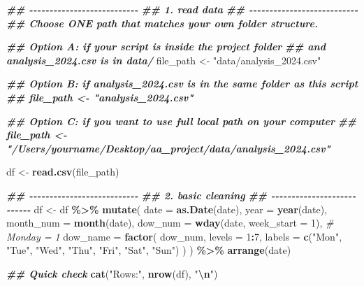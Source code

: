 \documentclass[
]{article}
\newenvironment{Shaded}{\begin{snugshade}}{\end{snugshade}}
\newcommand{\AttributeTok}[1]{\textcolor[rgb]{0.13,0.29,0.53}{#1}}
\newcommand{\CommentTok}[1]{\textcolor[rgb]{0.56,0.35,0.01}{\textit{#1}}}
\newcommand{\DecValTok}[1]{\textcolor[rgb]{0.00,0.00,0.81}{#1}}
\newcommand{\DocumentationTok}[1]{\textcolor[rgb]{0.56,0.35,0.01}{\textbf{\textit{#1}}}}
\newcommand{\FunctionTok}[1]{\textcolor[rgb]{0.13,0.29,0.53}{\textbf{#1}}}
\newcommand{\NormalTok}[1]{#1}
\newcommand{\OtherTok}[1]{\textcolor[rgb]{0.56,0.35,0.01}{#1}}
\newcommand{\SpecialCharTok}[1]{\textcolor[rgb]{0.81,0.36,0.00}{\textbf{#1}}}
\newcommand{\StringTok}[1]{\textcolor[rgb]{0.31,0.60,0.02}{#1}}
\begin{document}
\begin{Shaded}
\begin{Highlighting}[]
\DocumentationTok{\#\# {-}{-}{-}{-}{-}{-}{-}{-}{-}{-}{-}{-}{-}{-}{-}{-}{-}{-}{-}{-}{-}{-}{-}{-}{-}{-}{-}}
\DocumentationTok{\#\# 1. read data}
\DocumentationTok{\#\# {-}{-}{-}{-}{-}{-}{-}{-}{-}{-}{-}{-}{-}{-}{-}{-}{-}{-}{-}{-}{-}{-}{-}{-}{-}{-}{-}}
\DocumentationTok{\#\# Choose ONE path that matches your own folder structure.}

\DocumentationTok{\#\# Option A: if your script is inside the project folder}
\DocumentationTok{\#\# and analysis\_2024.csv is in data/}
\NormalTok{file\_path }\OtherTok{\textless{}{-}} \StringTok{"data/analysis\_2024.csv"}

\DocumentationTok{\#\# Option B: if analysis\_2024.csv is in the same folder as this script}
\DocumentationTok{\#\# file\_path \textless{}{-} "analysis\_2024.csv"}

\DocumentationTok{\#\# Option C: if you want to use full local path on your computer}
\DocumentationTok{\#\# file\_path \textless{}{-} "/Users/yourname/Desktop/aa\_project/data/analysis\_2024.csv"}

\NormalTok{df }\OtherTok{\textless{}{-}} \FunctionTok{read.csv}\NormalTok{(file\_path)}
\end{Highlighting}
\end{Shaded}

\begin{Shaded}
\begin{Highlighting}[]
\DocumentationTok{\#\# {-}{-}{-}{-}{-}{-}{-}{-}{-}{-}{-}{-}{-}{-}{-}{-}{-}{-}{-}{-}{-}{-}{-}{-}{-}{-}{-}}
\DocumentationTok{\#\# 2. basic cleaning}
\DocumentationTok{\#\# {-}{-}{-}{-}{-}{-}{-}{-}{-}{-}{-}{-}{-}{-}{-}{-}{-}{-}{-}{-}{-}{-}{-}{-}{-}{-}{-}}
\NormalTok{df }\OtherTok{\textless{}{-}}\NormalTok{ df }\SpecialCharTok{\%\textgreater{}\%}
  \FunctionTok{mutate}\NormalTok{(}
    \AttributeTok{date =} \FunctionTok{as.Date}\NormalTok{(date),}
    \AttributeTok{year =} \FunctionTok{year}\NormalTok{(date),}
    \AttributeTok{month\_num =} \FunctionTok{month}\NormalTok{(date),}
    \AttributeTok{dow\_num =} \FunctionTok{wday}\NormalTok{(date, }\AttributeTok{week\_start =} \DecValTok{1}\NormalTok{),  }\CommentTok{\# Monday = 1}
    \AttributeTok{dow\_name =} \FunctionTok{factor}\NormalTok{(}
\NormalTok{      dow\_num,}
      \AttributeTok{levels =} \DecValTok{1}\SpecialCharTok{:}\DecValTok{7}\NormalTok{,}
      \AttributeTok{labels =} \FunctionTok{c}\NormalTok{(}\StringTok{"Mon"}\NormalTok{, }\StringTok{"Tue"}\NormalTok{, }\StringTok{"Wed"}\NormalTok{, }\StringTok{"Thu"}\NormalTok{, }\StringTok{"Fri"}\NormalTok{, }\StringTok{"Sat"}\NormalTok{, }\StringTok{"Sun"}\NormalTok{)}
\NormalTok{    )}
\NormalTok{  ) }\SpecialCharTok{\%\textgreater{}\%}
  \FunctionTok{arrange}\NormalTok{(date)}

\DocumentationTok{\#\# Quick check}
\FunctionTok{cat}\NormalTok{(}\StringTok{"Rows:"}\NormalTok{, }\FunctionTok{nrow}\NormalTok{(df), }\StringTok{"}\SpecialCharTok{\textbackslash{}n}\StringTok{"}\NormalTok{)}
\end{Highlighting}
\end{Shaded}
\end{document}
